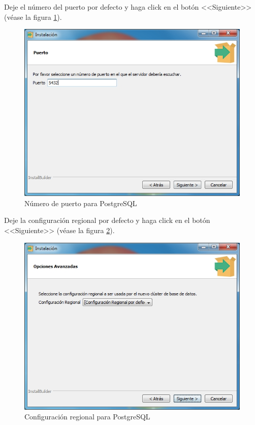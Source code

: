 Deje el n\'{u}mero del puerto por defecto y haga click en el bot\'{o}n <<Siguiente>> (v\'{e}ase la figura \ref{fig:postgres5}).
\vfill
\begin{figure}[H]
  \centering
  \includegraphics[width=.6\linewidth]{./img/postgres5.jpg}
\caption[]{N\'{u}mero de puerto para PostgreSQL\label{fig:postgres5}}
\end{figure}
\vfill
Deje la configuraci\'{o}n regional por defecto y haga click en el bot\'{o}n <<Siguiente>> (v\'{e}ase la figura \ref{fig:postgres6}).
\vfill
\begin{figure}[H]
  \centering
  \includegraphics[width=.6\linewidth]{./img/postgres6.jpg}
\caption[]{Configuraci\'{o}n regional para PostgreSQL\label{fig:postgres6}}
\end{figure}
\vfill
\newpage

